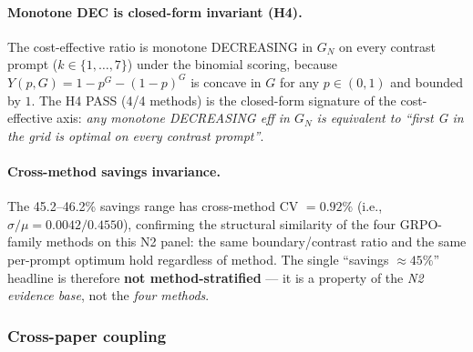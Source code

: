 \documentclass{article}
\begin{document}
\paragraph{Monotone DEC is closed-form invariant (H4).}

The cost-effective ratio is monotone DECREASING in $G_N$ on every
contrast prompt ($k \in \{1, \ldots, 7\}$) under the binomial scoring,
because $Y(p, G) = 1 - p^G - (1-p)^G$ is concave in $G$ for any
$p \in (0, 1)$ and bounded by $1$. The H4 PASS (4/4 methods) is the
closed-form signature of the cost-effective axis: \emph{any monotone
DECREASING eff in $G_N$ is equivalent to ``first G in the grid is
optimal on every contrast prompt''}.

\paragraph{Cross-method savings invariance.}

The 45.2--46.2\% savings range has cross-method CV $= 0.92\%$ (i.e.,
$\sigma / \mu = 0.0042 / 0.4550$), confirming the structural
similarity of the four GRPO-family methods on this N2 panel: the same
boundary/contrast ratio and the same per-prompt optimum hold regardless
of method. The single ``savings $\approx 45\%$'' headline is therefore
\textbf{not method-stratified} --- it is a property of the \emph{N2
evidence base}, not the \emph{four methods}.

\subsubsection*{Cross-paper coupling}
\end{document}
